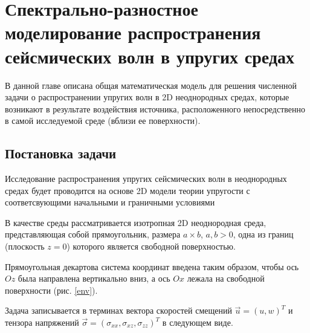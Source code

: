 \section{Спектрально-разностное моделирование распространения сейсмических волн в упругих средах}

В данной главе описана общая математическая модель для решения численной задачи о распространении
упругих волн в 2D неоднородных средах, которые возникают в результате воздействия источника,
расположенного непосредственно в самой исследуемой среде (вблизи ее поверхности).

\subsection{Постановка задачи}
Исследование распространения упругих сейсмических волн в неоднородных средах будет проводится на 
основе 2D модели теории упругости с соответсвующими начальными и граничными условиями \cite{novac, filon, shem}

В качестве среды рассматривается изотропная 2D неоднородная среда, представляющая собой прямоугольник, размера $a \times b$, $a, b>0$,
одна из границ (плоскость $z = 0$) которого является свободной поверхностью.

Прямоугольная декартова система координат введена таким образом, чтобы ось $Oz$ была направлена вертикально вниз,
а ось $Ox$ лежала на свободной поверхности (рис. \ref{env}).


Задача записывается в терминах вектора скоростей смещений $\vec{u}={(u, w)}^T$
и тензора напряжений $\vec{\sigma}=(\sigma_{xx}, \sigma_{xz}, \sigma_{zz})^T$ в следующем виде.

